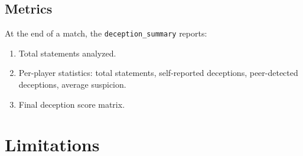 \documentclass[12pt]{article}
\begin{document}
\subsection{Metrics}
At the end of a match, the \texttt{deception\_summary} reports:
\begin{enumerate}
    \item Total statements analyzed.
    \item Per-player statistics: total statements, self-reported deceptions, peer-detected deceptions, average suspicion.
    \item Final deception score matrix.
\end{enumerate}

\section{Limitations}

\appendix
\end{document}
